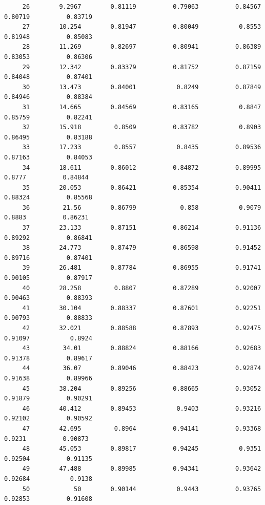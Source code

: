 \documentclass[
]{book}
\begin{document}
\begin{verbatim}
     26        9.2967        0.81119          0.79063          0.84567          0.80719          0.83719   
     27        10.254        0.81947          0.80049           0.8553          0.81948          0.85083   
     28        11.269        0.82697          0.80941          0.86389          0.83053          0.86306   
     29        12.342        0.83379          0.81752          0.87159          0.84048          0.87401   
     30        13.473        0.84001           0.8249          0.87849          0.84946          0.88384   
     31        14.665        0.84569          0.83165           0.8847          0.85759          0.82241   
     32        15.918         0.8509          0.83782           0.8903          0.86495          0.83188   
     33        17.233         0.8557           0.8435          0.89536          0.87163          0.84053   
     34        18.611        0.86012          0.84872          0.89995           0.8777          0.84844   
     35        20.053        0.86421          0.85354          0.90411          0.88324          0.85568   
     36         21.56        0.86799            0.858           0.9079           0.8883          0.86231   
     37        23.133        0.87151          0.86214          0.91136          0.89292          0.86841   
     38        24.773        0.87479          0.86598          0.91452          0.89716          0.87401   
     39        26.481        0.87784          0.86955          0.91741          0.90105          0.87917   
     40        28.258         0.8807          0.87289          0.92007          0.90463          0.88393   
     41        30.104        0.88337          0.87601          0.92251          0.90793          0.88833   
     42        32.021        0.88588          0.87893          0.92475          0.91097           0.8924   
     43         34.01        0.88824          0.88166          0.92683          0.91378          0.89617   
     44         36.07        0.89046          0.88423          0.92874          0.91638          0.89966   
     45        38.204        0.89256          0.88665          0.93052          0.91879          0.90291   
     46        40.412        0.89453           0.9403          0.93216          0.92102          0.90592   
     47        42.695         0.8964          0.94141          0.93368           0.9231          0.90873   
     48        45.053        0.89817          0.94245           0.9351          0.92504          0.91135   
     49        47.488        0.89985          0.94341          0.93642          0.92684           0.9138   
     50            50        0.90144           0.9443          0.93765          0.92853          0.91608   
\end{verbatim}
\end{document}
